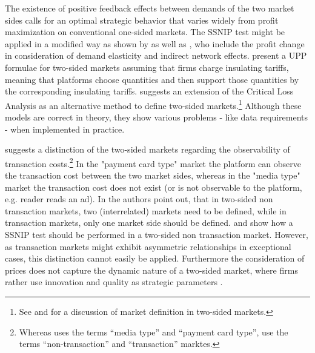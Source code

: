 \documentclass[12pt,a4paper,notitlepage]{article}
\begin{document}
The existence of positive feedback effects between demands of the two market sides calls for an optimal strategic behavior that varies widely from profit maximization on conventional one-sided markets. The SSNIP test might be applied in a modified way as shown by \citet{filistrucchi_market_2013} as well as \citet{evans_defining_2007}, who include the profit change in consideration of demand elasticity and indirect network effects. \citet{white_insulated_2012} present a UPP formulae for two-sided markets assuming that firms charge insulating tariffs, meaning that platforms choose quantities and then support those quantities by the corresponding insulating tariffs. \citet{noel_analyzing_2005} suggests an extension of the Critical Loss Analysis as an alternative method to define two-sided markets.\footnote{See \citet{evans_two-sided_2012} and \citet{filistrucchi_identifying_2012} for a discussion of market definition in two-sided markets.} Although these models are correct in theory, they show various problems - like data requirements - when implemented in practice. 

\citet{filistrucchi_ssnip_2008} suggests a distinction of the two-sided markets regarding the observability of transaction costs.\footnote{Whereas \citet{filistrucchi_ssnip_2008} uses the terms “media type” and “payment card type”, \citet{filistrucchi_market_2013} use the terms “non-transaction” and “transaction” marktes.} In the "payment card type" market the platform can observe the transaction cost between the two market sides, whereas in the "media type" market the transaction cost does not exist (or is not observable to the platform, e.g. reader reads an ad). In \citet{filistrucchi_market_2013} the authors point out, that in two-sided non transaction markets, two (interrelated) markets need to be defined, while in transaction markets, only one market side should be defined. \citet{emch_market_2006} and \citet{alexandrov_antitrust_2011} show how a SSNIP test should be performed in a two-sided non transaction market. However, as transaction markets might exhibit asymmetric relationships in exceptional cases, this distinction cannot easily be applied. Furthermore the consideration of prices does not capture the dynamic nature of a two-sided market, where firms rather use innovation and quality as strategic parameters \citep{gual_market_2003}.
\end{document}
